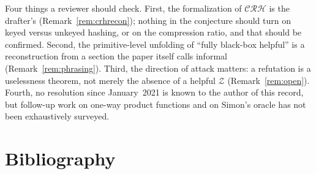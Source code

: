 \documentclass{aicr-conjecture}
\newcommand{\CRHc}{\mathcal{CRH}}
\newcommand{\Zc}{\mathcal{Z}}
\begin{document}
\begin{remark}\label{rem:caveats}
Four things a reviewer should check. First, the formalization of $\CRHc$
is the drafter's (Remark~\ref{rem:crhrecon}); nothing in the conjecture
should turn on keyed versus unkeyed hashing, or on the compression ratio,
and that should be confirmed. Second, the primitive-level unfolding of
``fully black-box helpful'' is a reconstruction from a section the paper
itself calls informal (Remark~\ref{rem:phrasing}). Third, the direction
of attack matters: a refutation is a uselessness theorem, not merely the
absence of a helpful $\Zc$ (Remark~\ref{rem:open}). Fourth, no
resolution since January~2021 is known to the author of this record, but
follow-up work on one-way product functions and on Simon's oracle has not
been exhaustively surveyed.
\end{remark}

\section{Bibliography}
\end{document}
